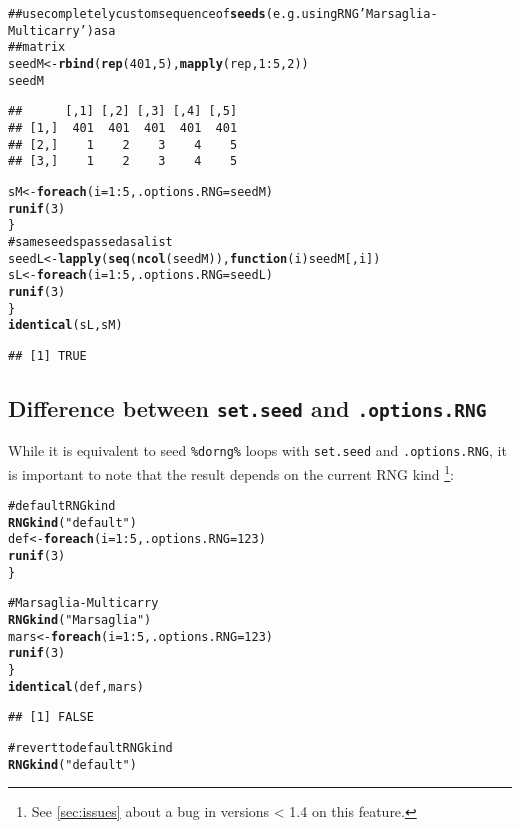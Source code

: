 \documentclass[a4paper,12pt]{article}\usepackage{graphicx, color}
\makeatletter
\newcommand{\hlfunctioncall}[1]{\textcolor[rgb]{0.501960784313725,0,0.329411764705882}{\textbf{#1}}}%
\newcommand{\hlstring}[1]{\textcolor[rgb]{0.6,0.6,1}{#1}}%
\newcommand{\hlcomment}[1]{\textcolor[rgb]{0.180392156862745,0.6,0.341176470588235}{#1}}%
\newenvironment{kframe}{%
 \def\at@end@of@kframe{}%
 \ifinner\ifhmode%
  \def\at@end@of@kframe{\end{minipage}}%
  \begin{minipage}{\columnwidth}%
 \fi\fi%
 \def\FrameCommand##1{\hskip\@totalleftmargin \hskip-\fboxsep
 \colorbox{shadecolor}{##1}\hskip-\fboxsep
     \hskip-\linewidth \hskip-\@totalleftmargin \hskip\columnwidth}%
 \MakeFramed {\advance\hsize-\width
   \@totalleftmargin\z@ \linewidth\hsize
   \@setminipage}}%
 {\par\unskip\endMakeFramed%
 \at@end@of@kframe}
\newenvironment{knitrout}{}{} %
\renewenvironment{knitrout}{\begin{footnotesize}}{\end{footnotesize}}
\let\code=\texttt
\newcommand{\dorng}{\code{\%dorng\%}\xspace}
\makeatother
\begin{document}
\begin{description}
\begin{knitrout}
\begin{kframe}
\begin{alltt}
\hlcomment{## use completely custom sequence of \hlfunctioncall{seeds} (e.g. using RNG \hlstring{'Marsaglia-Multicarry'}) as a}
\hlcomment{## matrix}
seedM <- \hlfunctioncall{rbind}(\hlfunctioncall{rep}(401, 5), \hlfunctioncall{mapply}(rep, 1:5, 2))
seedM
\end{alltt}
\begin{verbatim}
##      [,1] [,2] [,3] [,4] [,5]
## [1,]  401  401  401  401  401
## [2,]    1    2    3    4    5
## [3,]    1    2    3    4    5
\end{verbatim}
\begin{alltt}
sM <- \hlfunctioncall{foreach}(i = 1:5, .options.RNG = seedM) %dorng% \{
    \hlfunctioncall{runif}(3)
\}
\hlcomment{# same seeds passed as a list}
seedL <- \hlfunctioncall{lapply}(\hlfunctioncall{seq}(\hlfunctioncall{ncol}(seedM)), \hlfunctioncall{function}(i) seedM[, i])
sL <- \hlfunctioncall{foreach}(i = 1:5, .options.RNG = seedL) %dorng% \{
    \hlfunctioncall{runif}(3)
\}
\hlfunctioncall{identical}(sL, sM)
\end{alltt}
\begin{verbatim}
## [1] TRUE
\end{verbatim}
\end{kframe}
\end{knitrout}

\end{description}

\subsection{Difference between \texttt{set.seed} and \texttt{.options.RNG}}
\label{sec:set_seed}

While it is equivalent to seed \dorng loops with \code{set.seed} and \code{.options.RNG},
it is important to note that the result depends on the current RNG kind
\footnote{See \cref{sec:issues} about a bug in versions < 1.4 on this feature.}:

\begin{knitrout}
\color{fgcolor}\begin{kframe}
\begin{alltt}
\hlcomment{# default RNG kind}
\hlfunctioncall{RNGkind}(\hlstring{"default"})
def <- \hlfunctioncall{foreach}(i = 1:5, .options.RNG = 123) %dorng% \{
    \hlfunctioncall{runif}(3)
\}

\hlcomment{# Marsaglia-Multicarry}
\hlfunctioncall{RNGkind}(\hlstring{"Marsaglia"})
mars <- \hlfunctioncall{foreach}(i = 1:5, .options.RNG = 123) %dorng% \{
    \hlfunctioncall{runif}(3)
\}
\hlfunctioncall{identical}(def, mars)
\end{alltt}
\begin{verbatim}
## [1] FALSE
\end{verbatim}
\begin{alltt}

\hlcomment{# revert to default RNG kind}
\hlfunctioncall{RNGkind}(\hlstring{"default"})
\end{alltt}
\end{kframe}
\end{knitrout}
\end{document}
